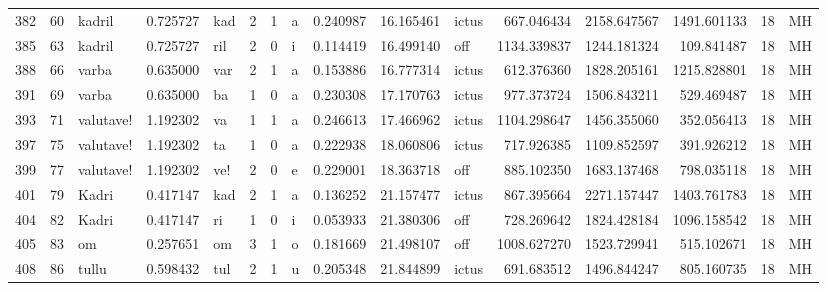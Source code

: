 \begin{tabular}{lrlrllllrrlrrrll}
382  &          60 &           kadril &  0.725727 &     kad &        2 &      1 &       a &      0.240987 &     16.165461 &  ictus &   667.046434 &  2158.647567 &  1491.601133 &     18 &        MH \\
385  &          63 &           kadril &  0.725727 &     ril &        2 &      0 &       i &      0.114419 &     16.499140 &    off &  1134.339837 &  1244.181324 &   109.841487 &     18 &        MH \\
388  &          66 &            varba &  0.635000 &     var &        2 &      1 &       a &      0.153886 &     16.777314 &  ictus &   612.376360 &  1828.205161 &  1215.828801 &     18 &        MH \\
391  &          69 &            varba &  0.635000 &      ba &        1 &      0 &       a &      0.230308 &     17.170763 &  ictus &   977.373724 &  1506.843211 &   529.469487 &     18 &        MH \\
393  &          71 &        valutave! &  1.192302 &      va &        1 &      1 &       a &      0.246613 &     17.466962 &  ictus &  1104.298647 &  1456.355060 &   352.056413 &     18 &        MH \\
397  &          75 &        valutave! &  1.192302 &      ta &        1 &      0 &       a &      0.222938 &     18.060806 &  ictus &   717.926385 &  1109.852597 &   391.926212 &     18 &        MH \\
399  &          77 &        valutave! &  1.192302 &     ve! &        2 &      0 &       e &      0.229001 &     18.363718 &    off &   885.102350 &  1683.137468 &   798.035118 &     18 &        MH \\
401  &          79 &            Kadri &  0.417147 &     kad &        2 &      1 &       a &      0.136252 &     21.157477 &  ictus &   867.395664 &  2271.157447 &  1403.761783 &     18 &        MH \\
404  &          82 &            Kadri &  0.417147 &      ri &        1 &      0 &       i &      0.053933 &     21.380306 &    off &   728.269642 &  1824.428184 &  1096.158542 &     18 &        MH \\
405  &          83 &               om &  0.257651 &      om &        3 &      1 &       o &      0.181669 &     21.498107 &    off &  1008.627270 &  1523.729941 &   515.102671 &     18 &        MH \\
408  &          86 &            tullu &  0.598432 &     tul &        2 &      1 &       u &      0.205348 &     21.844899 &  ictus &   691.683512 &  1496.844247 &   805.160735 &     18 &        MH \\

\end{tabular}
